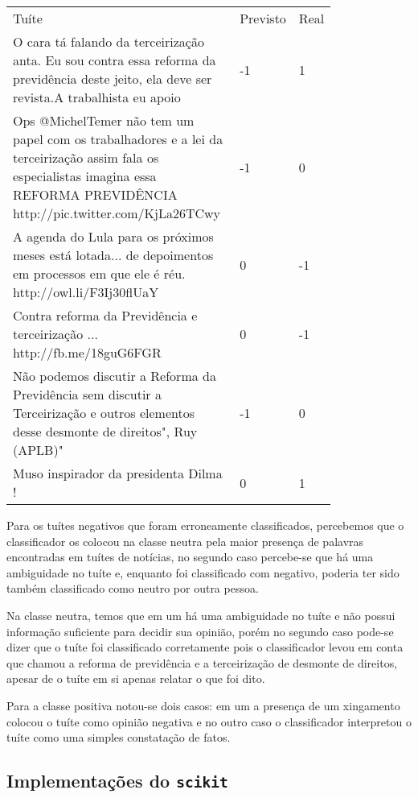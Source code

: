 \begin{table}[H]
	\centering	
	\begin{tabular}{| p{0.8\linewidth} | l | l |}
		\hline
		Tuíte & Previsto & Real \\
		O cara tá falando da terceirização anta. Eu sou contra essa reforma da previdência deste jeito, ela deve ser revista.A trabalhista eu apoio & -1 &  1 \\
		\hline
		Ops @MichelTemer não tem um papel com os trabalhadores e a lei da terceirização assim fala os especialistas imagina essa REFORMA PREVIDÊNCIA  http://pic.twitter.com/KjLa26TCwy &  -1 & 0 \\
		\hline
		A agenda do Lula para os próximos meses está lotada... de depoimentos em processos em que ele é réu. http://owl.li/F3Ij30flUaY & 0 & -1 \\
		\hline
		Contra reforma da Previdência e terceirização ... http://fb.me/18guG6FGR & 0 & -1 \\
		\hline
		Não podemos discutir a Reforma da Previdência sem discutir a Terceirização e outros elementos desse desmonte de direitos", Ruy (APLB)" & -1 & 0 \\
		\hline
		Muso inspirador da presidenta Dilma ! & 0 & 1 \\
		\hline
	\end{tabular}
\end{table} 

Para os tuítes negativos que foram erroneamente classificados, percebemos que o classificador os
colocou na classe neutra pela maior presença de palavras encontradas em tuítes de notícias, no segundo
caso percebe-se que há uma ambiguidade no tuíte e, enquanto foi classificado com negativo, poderia
ter sido também classificado como neutro por outra pessoa.

Na classe neutra, temos que em um há uma ambiguidade no tuíte e não possui informação suficiente
para decidir sua opinião, porém no segundo caso pode-se dizer que o tuíte foi classificado corretamente
pois o classificador levou em conta que chamou a reforma de previdência e a terceirização de desmonte
de direitos, apesar de o tuíte em si apenas relatar o que foi dito.

Para a classe positiva notou-se dois casos: em um a presença de um xingamento colocou o tuíte como
opinião negativa e no outro caso o classificador interpretou o tuíte como uma simples constatação
de fatos.


\subsection{Implementações do \texttt{scikit}}

